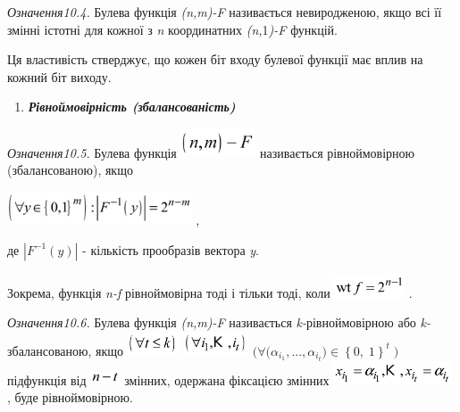 \documentclass[a4paper]{article}
\newcounter{saveenum}
\newcommand\liststyleWWviiiNumxxix{%
\renewcommand\theenumi{\arabic{enumi}}
\renewcommand\theenumii{\arabic{enumii}}
\renewcommand\theenumiii{\roman{enumiii}}
\renewcommand\theenumiv{\arabic{enumiv}}
\renewcommand\labelenumi{\theenumi.}
\renewcommand\labelenumii{\theenumii.}
\renewcommand\labelenumiii{\theenumiii.}
\renewcommand\labelenumiv{\theenumiv.}
}
\newcounter{}
\begin{document}
 \textit{Означення10.4.}\textit{ }Булева функція
\textit{(}\textit{n}\textit{,}\textit{m}\textit{)-}\textit{F}  називається
невиродженою, якщо всі її змінні істотні для кожної з \textit{n} координатних
\textit{(}\textit{n}\textit{,}1\textit{)-}\textit{F}  функцій.

Ця властивість стверджує, що кожен біт входу булевої функції має вплив на кожний
біт виходу.


\bigskip

\liststyleWWviiiNumxxix
\setcounter{saveenum}{\value{enumi}}
\begin{enumerate}
\setcounter{enumi}{\value{saveenum}}
\item {\bfseries\itshape
Рівноймовірність (збалансованість)}
\end{enumerate}
 \textit{Означення10.5.}\textit{ }Булева функція 
\includegraphics[width=0.8744in,height=0.3425in]{crypt-img/crypt-img196.png} 
називається рівноймовірною (збалансованою), якщо 

{\centering
 \includegraphics[width=2.1528in,height=0.389in]{crypt-img/crypt-img197.png} ,
\par}

де   ${|F^{{-1}}(y)|}$ - кількість прообразів вектора  \textit{y}.

Зокрема, функція \textit{n}\textit{{}-}\textit{f} рівноймовірна тоді і тільки
тоді, коли 
\includegraphics[width=0.8193in,height=0.278in]{crypt-img/crypt-img198.png} .

\textit{ }\textit{Означення10.6.}\textit{ }Булева функція
\textit{(}\textit{n}\textit{,}\textit{m}\textit{)-}\textit{F}  називається
\textit{k}\textit{{}-}рівноймовірною або \textit{k}\textit{{}-}збалансованою,
якщо 
\includegraphics[width=0.611in,height=0.278in]{crypt-img/crypt-img199.png}  
\includegraphics[width=0.75in,height=0.278in]{crypt-img/crypt-img200.png}  
${(\forall (\alpha _{{i_{{1}}}},\text{.}\text{.}\text{.},\alpha _{i_{{t}}}{)\in
\left\{0,\;1\right\}^{t}}{\;)}}$  підфункція від 
\includegraphics[width=0.3465in,height=0.1665in]{crypt-img/crypt-img201.png} 
змінних, одержана фіксацією змінних 
\includegraphics[width=1.389in,height=0.278in]{crypt-img/crypt-img202.png} ,
буде рівноймовірною.  
\end{document}
